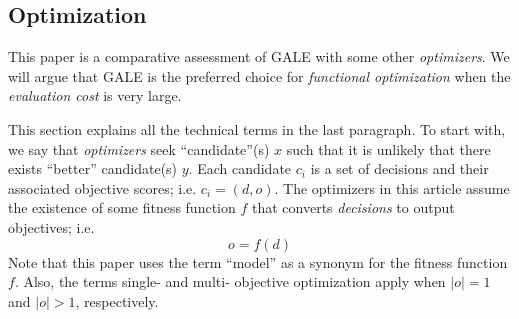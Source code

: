 \documentclass[10pt,journal,compsoc]{IEEEtran}
\newcommand{\bi}{\begin{itemize}}
\newcommand{\ei}{\end{itemize}}
\begin{document}
\subsection{Optimization}\label{sec:optz}
This paper is a comparative assessment of
GALE with some other  {\em optimizers}.
We  will argue that GALE is the preferred choice for
{\em functional optimization} when the {\em evaluation cost}
is very large.  

This section explains all the technical terms in the last paragraph.
To start with, we say that {\em optimizers} seek  ``candidate''(s)
  $x$ such that it is unlikely
 that there exists  ``better'' candidate(s) $y$. 
Each candidate  $c_i$ is a set of decisions and their
associated objective scores; i.e.  $c_i=(d,o)$. 
The optimizers in this article
assume  the existence of some fitness function $f$ that   converts {\em decisions} to
output objectives; i.e.
\[o = f(d)\]
Note that this paper uses the term ``model'' as a synonym for the fitness function $f$.
Also,
the terms single- and multi- objective
optimization apply when $\rvert o \rvert = 1$ and $\rvert o \rvert>1$, respectively.
\end{document}
